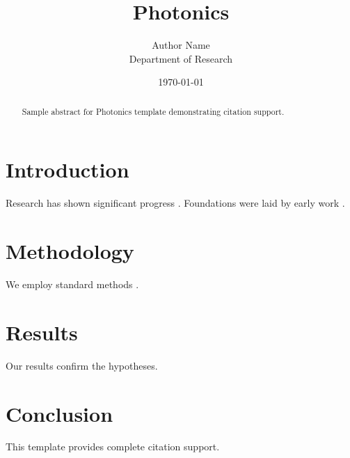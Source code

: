 \documentclass{mdpi}
\title{Photonics}
\author{Author Name \\ \small Department of Research}
\date{\today}
\begin{document}
\maketitle

\begin{abstract}
Sample abstract for Photonics template demonstrating citation support.
\end{abstract}

\section{Introduction}
Research has shown significant progress \citep{einstein1905}. Foundations were laid by early work \citep{turing1950}.

\section{Methodology}
We employ standard methods \citep{knuth1984}.

\section{Results}
Our results confirm the hypotheses.

\section{Conclusion}
This template provides complete citation support.



\end{document}
